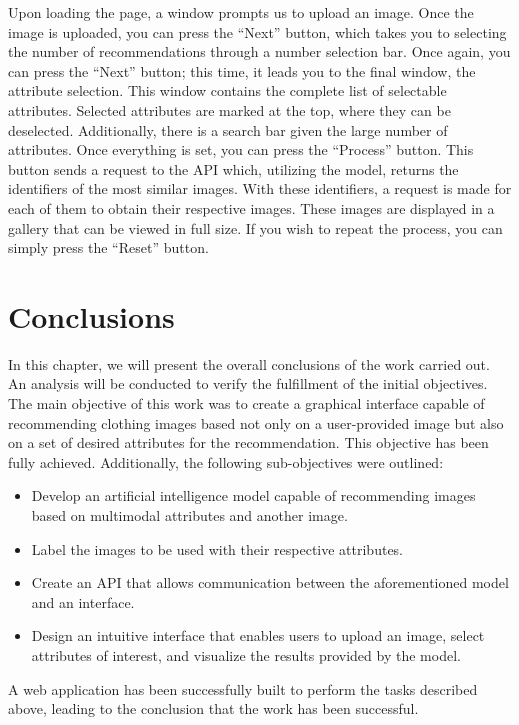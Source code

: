 \documentclass[12pt]{report} %
\begin{document}
Upon loading the page, a window prompts us to upload an image. Once the image is uploaded, you can press the ``Next'' button, which takes you to selecting the number of recommendations through a number selection bar. Once again, you can press the ``Next'' button; this time, it leads you to the final window, the attribute selection. This window contains the complete list of selectable attributes. Selected attributes are marked at the top, where they can be deselected. Additionally, there is a search bar given the large number of attributes. Once everything is set, you can press the ``Process'' button. This button sends a request to the API which, utilizing the model, returns the identifiers of the most similar images. With these identifiers, a request is made for each of them to obtain their respective images. These images are displayed in a gallery that can be viewed in full size. If you wish to repeat the process, you can simply press the ``Reset'' button.

\section*{Conclusions}
In this chapter, we will present the overall conclusions of the work carried out. An analysis will be conducted to verify the fulfillment of the initial objectives. The main objective of this work was to create a graphical interface capable of recommending clothing images based not only on a user-provided image but also on a set of desired attributes for the recommendation. This objective has been fully achieved. Additionally, the following sub-objectives were outlined:

\begin{itemize}
	\item Develop an artificial intelligence model capable of recommending images based on multimodal attributes and another image.
	\item Label the images to be used with their respective attributes.
	\item Create an API that allows communication between the aforementioned model and an interface.
	\item Design an intuitive interface that enables users to upload an image, select attributes of interest, and visualize the results provided by the model.
\end{itemize}

A web application has been successfully built to perform the tasks described above, leading to the conclusion that the work has been successful.
\end{document}
